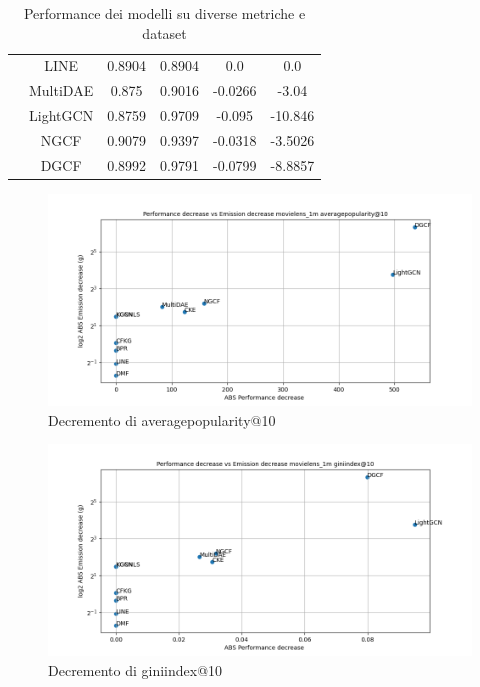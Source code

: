 \begin{table}[H]
{\begin{tabular}{|c|c|c|c|c|c|}
            & LINE     & 0.8904 & 0.8904 & 0.0      & 0.0       \\ \cline{2-6}
            & MultiDAE & 0.875  & 0.9016 & -0.0266  & -3.04     \\ \cline{2-6}
            & LightGCN & 0.8759 & 0.9709 & -0.095   & -10.846   \\ \cline{2-6}
            & NGCF     & 0.9079 & 0.9397 & -0.0318  & -3.5026   \\ \cline{2-6}
            & DGCF     & 0.8992 & 0.9791 & -0.0799  & -8.8857   \\ \hline
        \end{tabular}
    }
    \caption{Performance dei modelli su diverse metriche e dataset}
\end{table}



\begin{figure}[H]
    \centering
     \includegraphics[width=\textwidth]{images/decrement_averagepopularity@10_movielens_1m_30_7.png}
    \caption{Decremento di averagepopularity@10}
\end{figure}

\begin{figure}[H]
    \centering
     \includegraphics[width=\textwidth]{images/decrement_giniindex@10_movielens_1m_30_7.png}
    \caption{Decremento di giniindex@10}
\end{figure}

